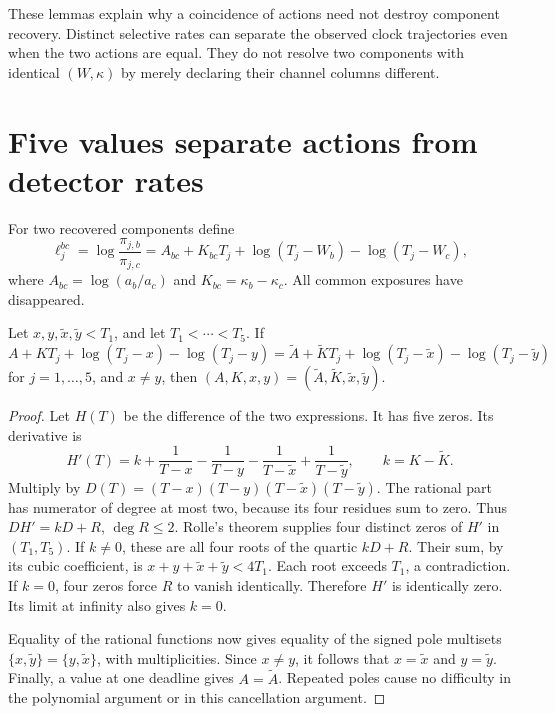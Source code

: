 These lemmas explain why a coincidence of actions need not destroy
component recovery. Distinct selective rates can separate the observed
clock trajectories even when the two actions are equal. They do not
resolve two components with identical $(W,\kappa)$ by merely declaring
their channel columns different.

\section{Five values separate actions from detector rates}
\label{sec:v82-interpolation}

For two recovered components define
\begin{equation}\label{eq:v82-logratio}
 \ell_j^{bc}=\log\frac{\pi_{j,b}}{\pi_{j,c}}
 =A_{bc}+K_{bc}T_j+\log(T_j-W_b)-\log(T_j-W_c),
\end{equation}
where $A_{bc}=\log(a_b/a_c)$ and
$K_{bc}=\kappa_b-\kappa_c$. All common exposures have disappeared.

\begin{lemma}\label{lem:v82-five}
Let $x,y,\widetilde x,\widetilde y<T_1$, and let $T_1<\cdots<T_5$.
If
\[
 A+KT_j+\log(T_j-x)-\log(T_j-y)
 =\widetilde A+\widetilde K T_j+
                  \log(T_j-\widetilde x)-\log(T_j-\widetilde y)
\]
for $j=1,\ldots,5$, and $x\ne y$, then
$(A,K,x,y)=(\widetilde A,\widetilde K,\widetilde x,\widetilde y)$.
\end{lemma}
\begin{proof}
Let $H(T)$ be the difference of the two expressions. It has five
zeros. Its derivative is
\[
 H'(T)=k+\frac1{T-x}-\frac1{T-y}
             -\frac1{T-\widetilde x}+\frac1{T-\widetilde y},
 \qquad k=K-\widetilde K.
\]
Multiply by
$D(T)=(T-x)(T-y)(T-\widetilde x)(T-\widetilde y)$.
The rational part has numerator of degree at most two, because its
four residues sum to zero. Thus $D H'=kD+R$, $\deg R\le2$.
Rolle's theorem supplies four distinct zeros of $H'$ in $(T_1,T_5)$.
If $k\ne0$, these are all four roots of the quartic $kD+R$.
Their sum, by its cubic coefficient, is
$x+y+\widetilde x+\widetilde y<4T_1$.
Each root exceeds $T_1$, a contradiction. If $k=0$, four zeros force
$R$ to vanish identically. Therefore $H'$ is identically zero.
Its limit at infinity also gives $k=0$.

Equality of the rational functions now gives equality of the signed
pole multisets
$\{x,\widetilde y\}=\{y,\widetilde x\}$, with multiplicities.
Since $x\ne y$, it follows that $x=\widetilde x$ and
$y=\widetilde y$. Finally, a value at one deadline gives
$A=\widetilde A$. Repeated poles cause no difficulty in the polynomial
argument or in this cancellation argument.
\end{proof}

